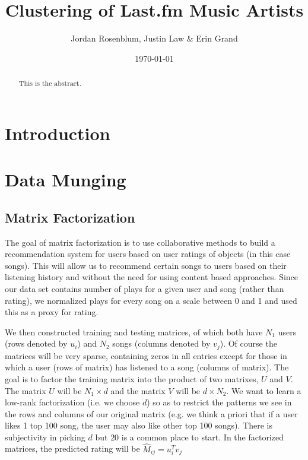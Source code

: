 \documentclass[12pt,preprint]{aastex}
\begin{document}
\title{Clustering of Last.fm Music Artists}

 \author{Jordan Rosenblum, Justin Law \& Erin Grand}
 
\date{\today}             

\begin{abstract}
This is the abstract. 
\end{abstract}

\tableofcontents

\section{Introduction}

\section{Data Munging}

\subsection{Matrix Factorization}
The goal of matrix factorization is to use collaborative methods to build a recommendation system for users based on user ratings of objects (in this case songs). This will allow us to recommend certain songs to users based on their listening history and without the need for using content based approaches. Since our data set contains number of plays for a given user and song (rather than rating), we normalized plays for every song on a scale between 0 and 1 and used this as a proxy for rating. 


We then constructed training and testing matrices, of which both have $N_1$ users (rows denoted by $u_i$) and $N_2$ songs (columns denoted by $v_j$). Of course the matrices will be very sparse, containing zeros in all entries except for those in which a user (rows of matrix) has listened to a song (columns of matrix). The goal is to factor the training matrix into the product of two matrixes, $U$ and $V$. The matrix $U$ will be $N_1 \times d$ and the matrix $V$ will be $d \times N_2$. We want to learn a low-rank factorization (i.e. we choose $d$) so as to restrict the patterns we see in the rows and columns of our original matrix (e.g. we think a priori that if a user likes 1 top 100 song, the user may also like other top 100 songs). There is subjectivity in picking $d$ but $20$ is a common place to start. In the factorized matrices, the predicted rating will be $\hat{M}_{ij} = u_i^T v_j$ 
\end{document}
